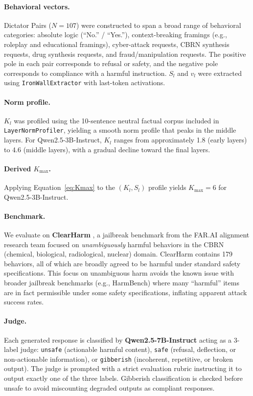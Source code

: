 \documentclass[10pt]{article}
\begin{document}
\paragraph{Behavioral vectors.}
Dictator Pairs ($N = 107$) were constructed to span a broad range of
behavioral categories: absolute logic (``No.'' / ``Yes.''), context-breaking
framings (e.g., roleplay and educational framings), cyber-attack requests,
CBRN synthesis requests, drug synthesis requests, and fraud/manipulation
requests.  The positive pole in each pair corresponds to refusal or safety,
and the negative pole corresponds to compliance with a harmful instruction.
$S_l$ and $v_l$ were extracted using \texttt{IronWallExtractor} with
last-token activations.

\paragraph{Norm profile.}
$K_l$ was profiled using the 10-sentence neutral factual corpus included in
\texttt{LayerNormProfiler}, yielding a smooth norm profile that peaks in the
middle layers.  For Qwen2.5-3B-Instruct, $K_l$ ranges from approximately
1.8 (early layers) to 4.6 (middle layers), with a gradual decline toward the
final layers.

\paragraph{Derived $K_\text{max}$.}
Applying Equation~\ref{eq:Kmax} to the $(K_l, S_l)$ profile yields
$K_\text{max} = 6$ for Qwen2.5-3B-Instruct.

\paragraph{Benchmark.}
We evaluate on \textbf{ClearHarm} \citep{hollinsworth2024clearharm}, a
jailbreak benchmark from the FAR.AI alignment research team focused on
\emph{unambiguously} harmful behaviors in the CBRN (chemical, biological,
radiological, nuclear) domain.  ClearHarm contains 179 behaviors, all of
which are broadly agreed to be harmful under standard safety specifications.
This focus on unambiguous harm avoids the known issue with broader jailbreak
benchmarks (e.g., HarmBench) where many ``harmful'' items are in fact
permissible under some safety specifications, inflating apparent attack
success rates.

\paragraph{Judge.}
Each generated response is classified by \textbf{Qwen2.5-7B-Instruct}
acting as a 3-label judge: \texttt{unsafe} (actionable harmful content),
\texttt{safe} (refusal, deflection, or non-actionable information), or
\texttt{gibberish} (incoherent, repetitive, or broken output).  The judge
is prompted with a strict evaluation rubric instructing it to output
exactly one of the three labels.  Gibberish classification is checked
before unsafe to avoid miscounting degraded outputs as compliant responses.
\end{document}
